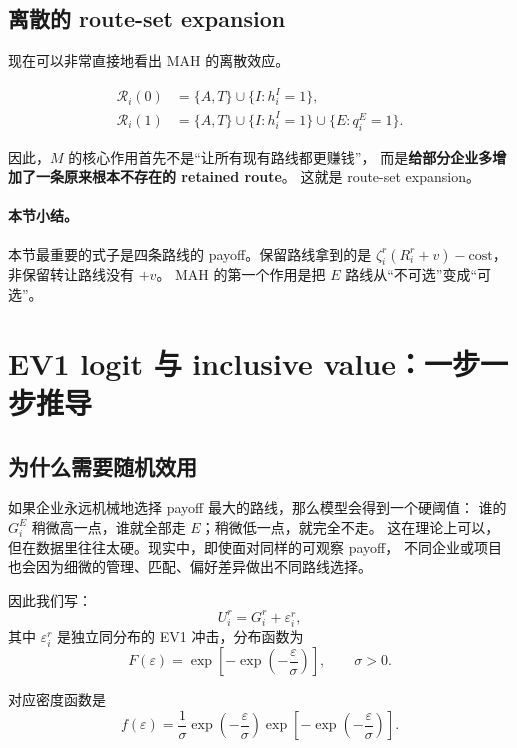 \documentclass[12pt,UTF8]{ctexart}
\newcommand{\Rset}{\mathcal{R}}
\theoremstyle{plain}
\theoremstyle{remark}
\begin{document}
\subsection{离散的 route-set expansion}

现在可以非常直接地看出 MAH 的离散效应。

\begin{align*}
\Rset_i(0)&=\{A,T\}\cup\{I:h_i^I=1\},\\
\Rset_i(1)&=\{A,T\}\cup\{I:h_i^I=1\}\cup\{E:q_i^E=1\}.
\end{align*}

因此，$M$ 的核心作用首先不是“让所有现有路线都更赚钱”，
而是\textbf{给部分企业多增加了一条原来根本不存在的 retained route}。
这就是 route-set expansion。

\paragraph{本节小结。}
本节最重要的式子是四条路线的 payoff。保留路线拿到的是
$\zeta_i^r(R_i^r+v)-\text{cost}$，非保留转让路线没有 $+v$。
MAH 的第一个作用是把 $E$ 路线从“不可选”变成“可选”。

\section{EV1 logit 与 inclusive value：一步一步推导}

\subsection{为什么需要随机效用}

如果企业永远机械地选择 payoff 最大的路线，那么模型会得到一个硬阈值：
谁的 $G_i^E$ 稍微高一点，谁就全部走 $E$；稍微低一点，就完全不走。
这在理论上可以，但在数据里往往太硬。现实中，即使面对同样的可观察 payoff，
不同企业或项目也会因为细微的管理、匹配、偏好差异做出不同路线选择。

因此我们写：
\begin{equation}
U_i^r = G_i^r + \varepsilon_i^r,
\label{eq:latent_utility}
\end{equation}
其中 $\varepsilon_i^r$ 是独立同分布的 EV1 冲击，分布函数为
\begin{equation}
F(\varepsilon)=\exp\left[-\exp\left(-\frac{\varepsilon}{\sigma}\right)\right],
\qquad \sigma>0.
\label{eq:ev1_cdf}
\end{equation}

对应密度函数是
\begin{equation}
f(\varepsilon)
=
\frac{1}{\sigma}
\exp\left(-\frac{\varepsilon}{\sigma}\right)
\exp\left[-\exp\left(-\frac{\varepsilon}{\sigma}\right)\right].
\label{eq:ev1_pdf}
\end{equation}
\end{document}
